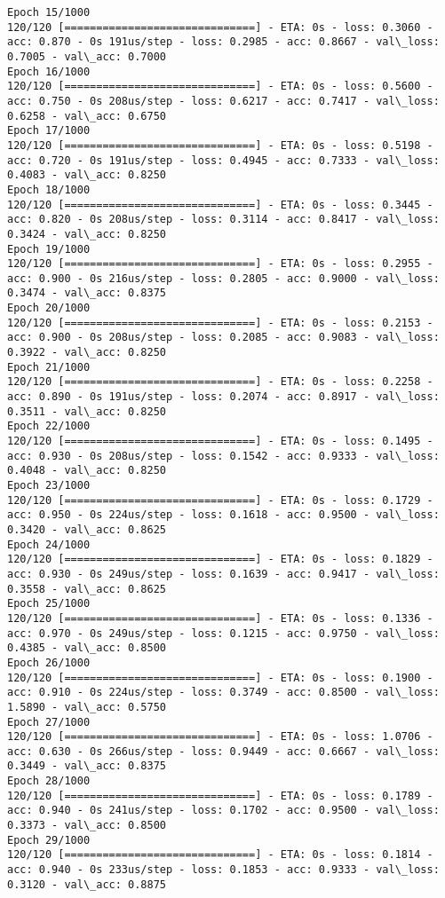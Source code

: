 \documentclass[11pt]{article}
\begin{document}
\begin{Verbatim}[commandchars=\\\{\}]
Epoch 15/1000
120/120 [==============================] - ETA: 0s - loss: 0.3060 - acc: 0.870 - 0s 191us/step - loss: 0.2985 - acc: 0.8667 - val\_loss: 0.7005 - val\_acc: 0.7000
Epoch 16/1000
120/120 [==============================] - ETA: 0s - loss: 0.5600 - acc: 0.750 - 0s 208us/step - loss: 0.6217 - acc: 0.7417 - val\_loss: 0.6258 - val\_acc: 0.6750
Epoch 17/1000
120/120 [==============================] - ETA: 0s - loss: 0.5198 - acc: 0.720 - 0s 191us/step - loss: 0.4945 - acc: 0.7333 - val\_loss: 0.4083 - val\_acc: 0.8250
Epoch 18/1000
120/120 [==============================] - ETA: 0s - loss: 0.3445 - acc: 0.820 - 0s 208us/step - loss: 0.3114 - acc: 0.8417 - val\_loss: 0.3424 - val\_acc: 0.8250
Epoch 19/1000
120/120 [==============================] - ETA: 0s - loss: 0.2955 - acc: 0.900 - 0s 216us/step - loss: 0.2805 - acc: 0.9000 - val\_loss: 0.3474 - val\_acc: 0.8375
Epoch 20/1000
120/120 [==============================] - ETA: 0s - loss: 0.2153 - acc: 0.900 - 0s 208us/step - loss: 0.2085 - acc: 0.9083 - val\_loss: 0.3922 - val\_acc: 0.8250
Epoch 21/1000
120/120 [==============================] - ETA: 0s - loss: 0.2258 - acc: 0.890 - 0s 191us/step - loss: 0.2074 - acc: 0.8917 - val\_loss: 0.3511 - val\_acc: 0.8250
Epoch 22/1000
120/120 [==============================] - ETA: 0s - loss: 0.1495 - acc: 0.930 - 0s 208us/step - loss: 0.1542 - acc: 0.9333 - val\_loss: 0.4048 - val\_acc: 0.8250
Epoch 23/1000
120/120 [==============================] - ETA: 0s - loss: 0.1729 - acc: 0.950 - 0s 224us/step - loss: 0.1618 - acc: 0.9500 - val\_loss: 0.3420 - val\_acc: 0.8625
Epoch 24/1000
120/120 [==============================] - ETA: 0s - loss: 0.1829 - acc: 0.930 - 0s 249us/step - loss: 0.1639 - acc: 0.9417 - val\_loss: 0.3558 - val\_acc: 0.8625
Epoch 25/1000
120/120 [==============================] - ETA: 0s - loss: 0.1336 - acc: 0.970 - 0s 249us/step - loss: 0.1215 - acc: 0.9750 - val\_loss: 0.4385 - val\_acc: 0.8500
Epoch 26/1000
120/120 [==============================] - ETA: 0s - loss: 0.1900 - acc: 0.910 - 0s 224us/step - loss: 0.3749 - acc: 0.8500 - val\_loss: 1.5890 - val\_acc: 0.5750
Epoch 27/1000
120/120 [==============================] - ETA: 0s - loss: 1.0706 - acc: 0.630 - 0s 266us/step - loss: 0.9449 - acc: 0.6667 - val\_loss: 0.3449 - val\_acc: 0.8375
Epoch 28/1000
120/120 [==============================] - ETA: 0s - loss: 0.1789 - acc: 0.940 - 0s 241us/step - loss: 0.1702 - acc: 0.9500 - val\_loss: 0.3373 - val\_acc: 0.8500
Epoch 29/1000
120/120 [==============================] - ETA: 0s - loss: 0.1814 - acc: 0.940 - 0s 233us/step - loss: 0.1853 - acc: 0.9333 - val\_loss: 0.3120 - val\_acc: 0.8875

\end{Verbatim}
\end{document}
